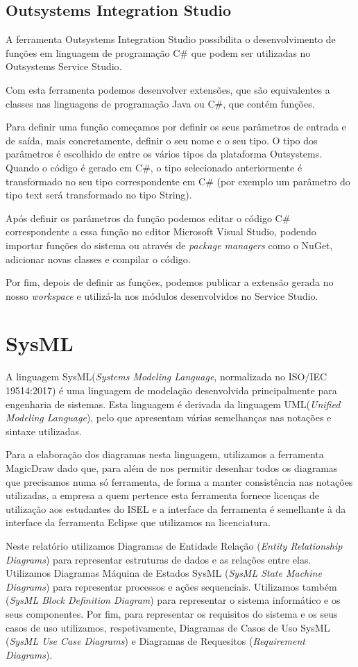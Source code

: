 \subsection{Outsystems Integration Studio} \label{sec:outsystemsi}
A ferramenta Outsystems Integration Studio possibilita o desenvolvimento de funções em linguagem de programação C\# que podem ser utilizadas no Outsystems Service Studio.\par
Com esta ferramenta podemos desenvolver extensões, que são equivalentes a classes nas linguagens de programação Java ou C\#, que contém funções. \par
Para definir uma função começamos por definir os seus parâmetros de entrada e de saída, mais concretamente, definir o seu nome e o seu tipo. O tipo dos parâmetros é escolhido de entre os vários tipos da plataforma Outsystems. Quando o código é gerado em C\#, o tipo selecionado anteriormente é transformado no seu tipo correspondente em C\# (por exemplo um parâmetro do tipo text será transformado no tipo String).\par
Após definir os parâmetros da função podemos editar o código C\# correspondente a essa função no editor Microsoft Visual Studio, podendo importar funções do sistema ou através de \textit{package managers} como o NuGet, adicionar novas classes e compilar o código.\par
Por fim, depois de definir as funções, podemos publicar a extensão gerada no nosso \textit{workspace} e utilizá-la nos módulos desenvolvidos no Service Studio.

\section{SysML} \label{sec:sysml}
A linguagem SysML(\textit{Systems Modeling Language}, normalizada no ISO/IEC 19514:2017\cite{isosys}) é uma linguagem de modelação desenvolvida principalmente para engenharia de sistemas. Esta linguagem é derivada da linguagem UML(\textit{Unified Modeling Language}), pelo que apresentam várias semelhanças nas notações e sintaxe utilizadas. \par
Para a elaboração dos diagramas nesta linguagem, utilizamos a ferramenta MagicDraw dado que, para além de nos permitir desenhar todos os diagramas que precisamos numa só ferramenta, de forma a manter consistência nas notações utilizadas, a empresa a quem pertence esta ferramenta fornece licenças de utilização aos estudantes do ISEL e a interface da ferramenta é semelhante à da interface da ferramenta Eclipse que utilizamos na licenciatura.\par
Neste relatório utilizamos Diagramas de Entidade Relação (\textit{Entity Relationship Diagrams}) para representar estruturas de dados e as relações entre elas. Utilizamos Diagramas Máquina de Estados SysML (\textit{SysML State Machine Diagrams}) para representar processos e ações sequenciais. Utilizamos também (\textit{SysML Block Definition Diagram}) para representar o sistema informático e os seus componentes. Por fim, para representar os requisitos do sistema e os seus casos de uso utilizamos, respetivamente, Diagramas de Casos de Uso SysML (\textit{SysML Use Case Diagrams}) e Diagramas de Requesitos (\textit{Requirement Diagrams}).

